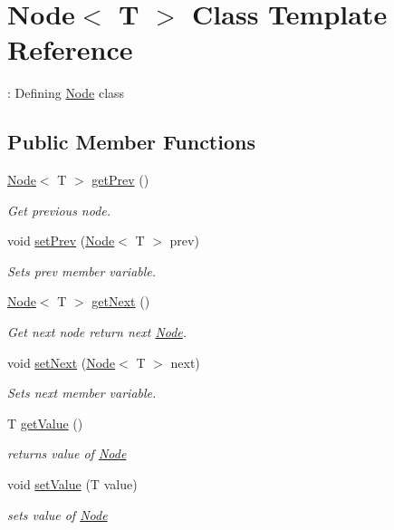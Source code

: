\hypertarget{classNode}{}\section{Node$<$ T $>$ Class Template Reference}
\label{classNode}


\+: Defining \hyperlink{classNode}{Node} class  


\subsection*{Public Member Functions}
\begin{DoxyCompactItemize}
\item 
\hyperlink{classNode}{Node}$<$ T $>$ \hyperlink{classNode_a8820838ccedbe0501158aed75feba1a3}{get\+Prev} ()
\begin{DoxyCompactList}\small\item\em Get previous node. \end{DoxyCompactList}\item 
void \hyperlink{classNode_ae629180d7027b785760c20f894fe765a}{set\+Prev} (\hyperlink{classNode}{Node}$<$ T $>$ prev)
\begin{DoxyCompactList}\small\item\em Sets \textquotesingle{}prev\textquotesingle{} member variable. \end{DoxyCompactList}\item 
\hyperlink{classNode}{Node}$<$ T $>$ \hyperlink{classNode_a2ec63a299666383d35bdde247fb7fb67}{get\+Next} ()\hypertarget{classNode_a2ec63a299666383d35bdde247fb7fb67}{}\label{classNode_a2ec63a299666383d35bdde247fb7fb67}

\begin{DoxyCompactList}\small\item\em Get next node return next \hyperlink{classNode}{Node}. \end{DoxyCompactList}\item 
void \hyperlink{classNode_a94f8b143101fb5b7dcf964ed5998e640}{set\+Next} (\hyperlink{classNode}{Node}$<$ T $>$ next)
\begin{DoxyCompactList}\small\item\em Sets \textquotesingle{}next\textquotesingle{} member variable. \end{DoxyCompactList}\item 
T \hyperlink{classNode_a8f0d4417f8e6d361a39f351e8fe1a730}{get\+Value} ()
\begin{DoxyCompactList}\small\item\em returns value of \hyperlink{classNode}{Node} \end{DoxyCompactList}\item 
void \hyperlink{classNode_ac7eacfef1bec39960d3f26f390dc4b83}{set\+Value} (T value)
\begin{DoxyCompactList}\small\item\em sets value of \hyperlink{classNode}{Node} \end{DoxyCompactList}\end{DoxyCompactItemize}


